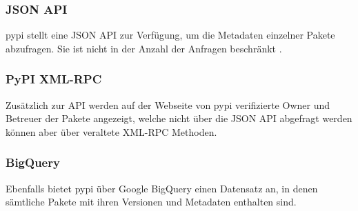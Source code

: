 \subsubsection*{JSON API}
\label{subsubsec:pypi_json_api}

\gls{pypi} stellt eine JSON API zur Verfügung, um die Metadaten einzelner Pakete abzufragen.
Sie ist nicht in der Anzahl der Anfragen beschränkt \autocite{python_software_foundation_warehouse_2024}.

\subsubsection*{PyPI XML-RPC}
\label{subsubsec:pypi_xml_rpc}
Zusätzlich zur API werden auf der Webseite von \gls{pypi} verifizierte Owner und Betreuer der Pakete angezeigt, welche nicht über die JSON API abgefragt werden können aber über veraltete XML-RPC Methoden.

\subsubsection*{BigQuery}
\label{subsubsec:pypi_bigquery}
Ebenfalls bietet \gls{pypi} über Google BigQuery einen Datensatz an, in denen sämtliche Pakete mit ihren Versionen und Metadaten enthalten sind.

